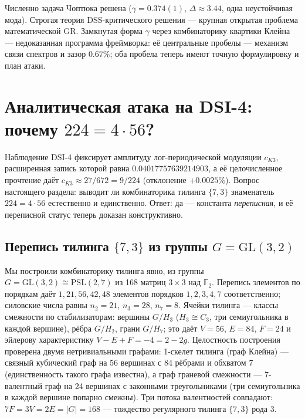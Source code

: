 \documentclass[11pt,a4paper]{article}
\theoremstyle{definition}
\theoremstyle{remark}
\begin{document}
\begin{findbox}
Численно задача Чоптюка решена ($\gamma = 0.374(1)$, $\Delta \approx 3.44$,
одна неустойчивая мода). Строгая теория DSS-критического решения --- крупная
открытая проблема математической GR. Замкнутая форма $\gamma$ через
комбинаторику квартики Клейна --- недоказанная программа фреймворка: её
центральные пробелы --- механизм связи спектров и зазор $0.67\%$; оба пробела
теперь имеют точную формулировку и план атаки.
\end{findbox}

\section{Аналитическая атака на DSI-4: почему $224 = 4\cdot 56$?}\label{sec:attack224}

Наблюдение DSI-4 фиксирует амплитуду лог-периодической модуляции $c_{K3}$,
расширенная запись которой равна $0.04017757639214903$, а её целочисленное
прочтение даёт $c_{K3} \approx 27/672 = 9/224$ (отклонение $+0.0025\%$).
Вопрос настоящего раздела: выводит ли комбинаторика тилинга $\{7,3\}$
знаменатель $224 = 4\cdot 56$ естественно и единственно. Ответ: да ---
константа \emph{переписная}, и её переписной статус теперь доказан
конструктивно.

\subsection{Перепись тилинга $\{7,3\}$ из группы $G = \mathrm{GL}(3,2)$}

Мы построили комбинаторику тилинга явно, из группы
$G = \mathrm{GL}(3,2) \cong \mathrm{PSL}(2,7)$ из 168 матриц $3\times 3$ над
$\mathbb{F}_2$. Перепись элементов по порядкам даёт $1, 21, 56, 42, 48$
элементов порядков $1, 2, 3, 4, 7$ соответственно; силовские числа равны
$n_2 = 21$, $n_3 = 28$, $n_7 = 8$. Ячейки тилинга --- классы смежности по
стабилизаторам: вершины $G/H_3$ ($H_3 \cong C_3$, три семиугольника в каждой
вершине), рёбра $G/H_2$, грани $G/H_7$; это даёт $V = 56$, $E = 84$,
$F = 24$ и эйлерову характеристику $V - E + F = -4 = 2 - 2g$. Целостность
построения проверена двумя нетривиальными графами: 1-скелет тилинга
(граф Клейна) --- связный кубический граф на 56 вершинах с 84 рёбрами и
обхватом 7 (единственность такого графа известна), а граф граневой смежности
--- 7-валентный граф на 24 вершинах с законными треугольниками (три
семиугольника в каждой вершине попарно смежны). Три потока валентностей
совпадают: $7F = 3V = 2E = |G| = 168$ --- тождество регулярного тилинга
$\{7,3\}$ рода 3.
\end{document}
